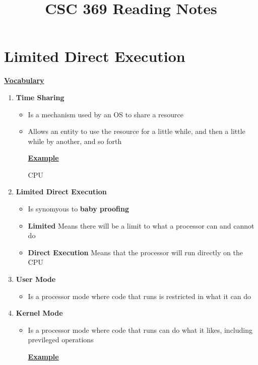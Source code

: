 \documentclass[12pt]{article}
\begin{document}
\title{CSC 369 Reading Notes}

\section{Limited Direct Execution}

\begin{mdframed}
\underline{\textbf{Vocabulary}}

\bigskip

\begin{enumerate}[1.]
    \item \textbf{Time Sharing}
    \begin{itemize}
        \item Is a mechanism used by an OS to share a resource
        \item Allows an entity to use the resource for a little while, and then
        a little while by another, and so forth

        \bigskip

        \underline{\textbf{Example}}

        \bigskip

        CPU
    \end{itemize}
    \item \textbf{Limited Direct Execution}
    \begin{itemize}
        \item Is synomyous to \textbf{baby proofing}
        \item \textbf{Limited} Means there will be a limit to what a processor can and cannot do
        \item \textbf{Direct Execution} Means that the processor will run directly on the CPU
    \end{itemize}
    \item \textbf{User Mode}
    \begin{itemize}
        \item Is a processor mode where code that runs is restricted in what it can do
    \end{itemize}
    \item \textbf{Kernel Mode}
    \begin{itemize}
        \item Is a processor mode where code that runs can do what it likes, including
        previleged operations

        \bigskip

        \underline{\textbf{Example}}


\end{itemize}
\end{enumerate}
\end{mdframed}
\end{document}
